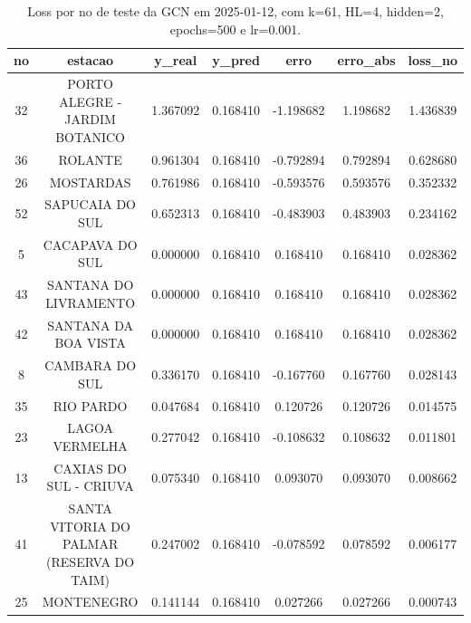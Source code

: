 \begin{table}[h]
\centering
\caption{Loss por no de teste da GCN em 2025-01-12, com k=61, HL=4, hidden=2, epochs=500 e lr=0.001.}
\label{tab:gcn_loss_k61_hl4_h2_e500_d20250112}
\begin{tabular}{ccccccc}
\toprule
no & estacao & y\_real & y\_pred & erro & erro\_abs & loss\_no \\
\midrule
32 & PORTO ALEGRE - JARDIM BOTANICO & 1.367092 & 0.168410 & -1.198682 & 1.198682 & 1.436839 \\
36 & ROLANTE & 0.961304 & 0.168410 & -0.792894 & 0.792894 & 0.628680 \\
26 & MOSTARDAS & 0.761986 & 0.168410 & -0.593576 & 0.593576 & 0.352332 \\
52 & SAPUCAIA DO SUL & 0.652313 & 0.168410 & -0.483903 & 0.483903 & 0.234162 \\
5 & CACAPAVA DO SUL & 0.000000 & 0.168410 & 0.168410 & 0.168410 & 0.028362 \\
43 & SANTANA DO LIVRAMENTO & 0.000000 & 0.168410 & 0.168410 & 0.168410 & 0.028362 \\
42 & SANTANA DA BOA VISTA & 0.000000 & 0.168410 & 0.168410 & 0.168410 & 0.028362 \\
8 & CAMBARA DO SUL & 0.336170 & 0.168410 & -0.167760 & 0.167760 & 0.028143 \\
35 & RIO PARDO & 0.047684 & 0.168410 & 0.120726 & 0.120726 & 0.014575 \\
23 & LAGOA VERMELHA & 0.277042 & 0.168410 & -0.108632 & 0.108632 & 0.011801 \\
13 & CAXIAS DO SUL - CRIUVA & 0.075340 & 0.168410 & 0.093070 & 0.093070 & 0.008662 \\
41 & SANTA VITORIA DO PALMAR (RESERVA DO TAIM) & 0.247002 & 0.168410 & -0.078592 & 0.078592 & 0.006177 \\
25 & MONTENEGRO & 0.141144 & 0.168410 & 0.027266 & 0.027266 & 0.000743 \\
\bottomrule
\end{tabular}
\end{table}
